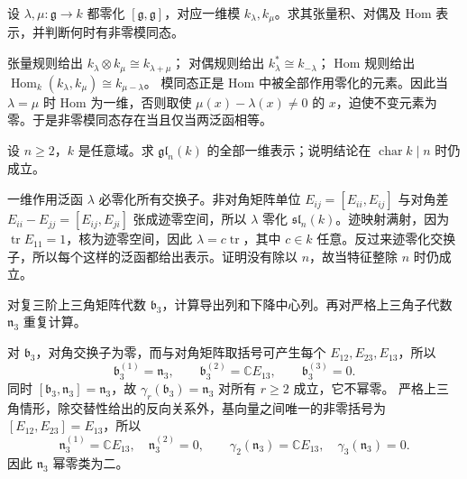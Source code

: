 \begin{exercise}\label{b5:ex:11-one-dimensional-operations}
	设 \(\lambda,\mu:\mathfrak g\rightarrow k\) 都零化 \([\mathfrak g,\mathfrak g]\)，对应一维模 \(k_\lambda,k_\mu\)。求其张量积、对偶及 Hom 表示，并判断何时有非零模同态。
\end{exercise}
\begin{solution}
	张量规则给出 \(k_\lambda\otimes k_\mu\cong k_{\lambda+\mu}\)； 对偶规则给出 \(k_\lambda^*\cong k_{-\lambda}\)； Hom 规则给出 \(\operatorname{Hom}_k(k_\lambda,k_\mu)\cong k_{\mu-\lambda}\)。 模同态正是 Hom 中被全部作用零化的元素。因此当 \(\lambda=\mu\) 时 Hom 为一维，否则取使 \(\mu(x)-\lambda(x)\ne0\) 的 \(x\)，迫使不变元素为零。于是非零模同态存在当且仅当两泛函相等。
\end{solution}

\begin{exercise}\label{b5:ex:11-gln-one-dimensional}
	设 \(n\ge2\)，\(k\) 是任意域。求 \(\mathfrak{gl}_n(k)\) 的全部一维表示；说明结论在 \(\operatorname{char}k\mid n\) 时仍成立。
\end{exercise}
\begin{solution}
	一维作用泛函 \(\lambda\) 必零化所有交换子。非对角矩阵单位 \(E_{ij}=[E_{ii},E_{ij}]\) 与对角差 \(E_{ii}-E_{jj}=[E_{ij},E_{ji}]\) 张成迹零空间，所以 \(\lambda\) 零化 \(\mathfrak{sl}_n(k)\)。迹映射满射，因为 \(\operatorname{tr}E_{11}=1\)，核为迹零空间，因此 \(\lambda=c\operatorname{tr}\)，其中 \(c\in k\) 任意。反过来迹零化交换子，所以每个这样的泛函都给出表示。证明没有除以 \(n\)，故当特征整除 \(n\) 时仍成立。
\end{solution}

\begin{exercise}\label{b5:ex:11-triangular-three-series}
	对复三阶上三角矩阵代数 \(\mathfrak b_3\)，计算导出列和下降中心列。再对严格上三角子代数 \(\mathfrak n_3\) 重复计算。
\end{exercise}
\begin{solution}
	对 \(\mathfrak b_3\)，对角交换子为零，而与对角矩阵取括号可产生每个 \(E_{12},E_{23},E_{13}\)，所以
	\[
		\mathfrak b_3^{(1)}=\mathfrak n_3,\qquad \mathfrak b_3^{(2)}=\mathbb CE_{13},\qquad \mathfrak b_3^{(3)}=0.
	\]
	同时 \([\mathfrak b_3,\mathfrak n_3]=\mathfrak n_3\)，故 \(\gamma_r(\mathfrak b_3)=\mathfrak n_3\) 对所有 \(r\ge2\) 成立，它不幂零。 严格上三角情形，除交替性给出的反向关系外，基向量之间唯一的非零括号为 \([E_{12},E_{23}]=E_{13}\)，所以
	\[
		\mathfrak n_3^{(1)}=\mathbb CE_{13},\quad \mathfrak n_3^{(2)}=0,\qquad \gamma_2(\mathfrak n_3)=\mathbb CE_{13},\quad \gamma_3(\mathfrak n_3)=0.
	\]
	因此 \(\mathfrak n_3\) 幂零类为二。
\end{solution}

